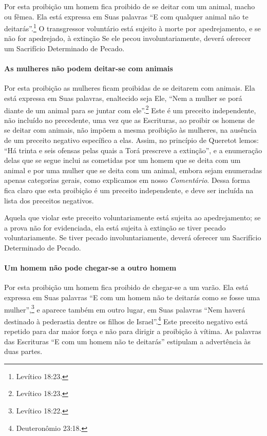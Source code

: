 Por esta proibição um homem fica proibido de se deitar com um animal,
macho ou fêmea. Ela está expressa em Suas palavras ``E com qualquer
animal não te deitarás''.\footnote{Levítico 18:23.} O transgressor voluntário
está sujeito à morte por apedrejamento, e se não for apedrejado, à
extinção Se ele pecou involuntariamente, deverá oferecer um Sacrifício
Determinado de Pecado.

\paragraph{As mulheres não podem deitar-se com animais}

Por esta proibição as mulheres ficam proibidas de se deitarem com
animais. Ela está expressa em Suas palavras, enaltecido seja Ele, ``Nem
a mulher se porá diante de um animal para se juntar com ele''.\footnote{Levítico
18:23.} Este é um preceito independente, não incluído no precedente, uma
vez que as Escrituras, ao proibir os homens de se deitar com animais,
não impõem a mesma proibição às mulheres, na ausência de um preceito
negativo específico a elas. Assim, no princípio de Queretot lemos: ``Há
trinta e seis ofensas pelas quais a Torá prescreve a extinção'', e a
enumeração delas que se segue inclui as cometidas por um homem que se
deita com um animal e por uma mulher que se deita com um animal, embora
sejam enumeradas apenas categorias gerais, como explicamos em nosso
\emph{Comentário}. Dessa forma fica claro que esta proibição é um preceito
independente, e deve ser incluída na lista dos preceitos negativos.

Aquela que violar este preceito voluntariamente está sujeita ao
apedrejamento; se a prova não for evidenciada, ela está sujeita à
extinção se tiver pecado voluntariamente. Se tiver pecado
involuntariamente, deverá oferecer um Sacrifício Determinado de Pecado.

\paragraph{Um homem não pode chegar-se a outro homem}

Por esta proibição um homem fica proibido de chegar-se a um varão. Ela
está expressa em Suas palavras ``E com um homem não te deitarás como se
fosse uma mulher'',\footnote{Levítico 18:22.} e aparece também em outro lugar, em
Suas palavras ``Nem haverá destinado à pederastia dentre os filhos de
Israel''.\footnote{Deuteronômio 23:18.} Este preceito negativo está repetido
para dar maior força e não para dirigir a proibição à vítima. As
palavras das Escrituras ``E com um homem não te deitarás'' estipulam a
advertência às duas partes.

